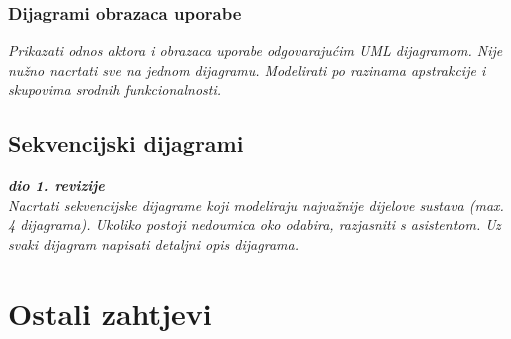 					
				\subsubsection{Dijagrami obrazaca uporabe}
					
					\textit{Prikazati odnos aktora i obrazaca uporabe odgovarajućim UML dijagramom. Nije nužno nacrtati sve na jednom dijagramu. Modelirati po razinama apstrakcije i skupovima srodnih funkcionalnosti.}
				\eject		
				
			\subsection{Sekvencijski dijagrami}
				
				\textbf{\textit{dio 1. revizije}}\\
				
				\textit{Nacrtati sekvencijske dijagrame koji modeliraju najvažnije dijelove sustava (max. 4 dijagrama). Ukoliko postoji nedoumica oko odabira, razjasniti s asistentom. Uz svaki dijagram napisati detaljni opis dijagrama.}
				\eject
	
		\section{Ostali zahtjevi}
			 
